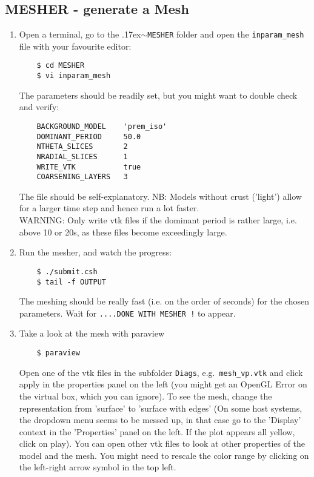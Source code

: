 \documentclass{article}
\newcommand{\ttilde}[0]{\raise.17ex\hbox{$\scriptstyle\sim$}}
\begin{document}
\subsection{MESHER - generate a Mesh}

\begin{enumerate}
    \item Open a terminal, go to the \ttilde\verb|MESHER| folder and open
    the \verb|inparam_mesh| file with your favourite editor:
    \begin{verbatim}
    $ cd MESHER
    $ vi inparam_mesh
    \end{verbatim}
    The parameters should be readily set, but you might want to double check and verify:
    \begin{verbatim}
    BACKGROUND_MODEL    'prem_iso'
    DOMINANT_PERIOD     50.0
    NTHETA_SLICES       2
    NRADIAL_SLICES      1
    WRITE_VTK           true
    COARSENING_LAYERS   3
    \end{verbatim}
    The file should be self-explanatory. NB: Models without crust ('light') allow for a
    larger time step and hence run a lot faster. \\
    WARNING: Only write vtk files if the dominant period is rather large, i.e. above 10 or
    20s, as these files become exceedingly large.

    \item Run the mesher, and watch the progress:
    \begin{verbatim}
    $ ./submit.csh
    $ tail -f OUTPUT
    \end{verbatim}
    The meshing should be really fast (i.e. on the order of seconds) for the chosen parameters. Wait for
    \verb|....DONE WITH MESHER !| to appear.

    \item Take a look at the mesh with paraview
    \begin{verbatim}
    $ paraview
    \end{verbatim}
    Open one of the vtk files in the subfolder \verb|Diags|, e.g.\
    \verb|mesh_vp.vtk| and click apply in the properties panel on the left (you
    might get an OpenGL Error on the virtual box, which you can ignore). To see
    the mesh, change the representation from 'surface' to 'surface with edges'
    (On some host systems, the dropdown menu seems to be messed up, in that
    case go to the 'Display' context in the 'Properties' panel on the left. If
    the plot appears all yellow, click on play).  You can open other vtk files
    to look at other properties of the model and the mesh. You might need to
    rescale the color range by clicking on the left-right arrow symbol in the
    top left.


\end{enumerate}
\end{document}
